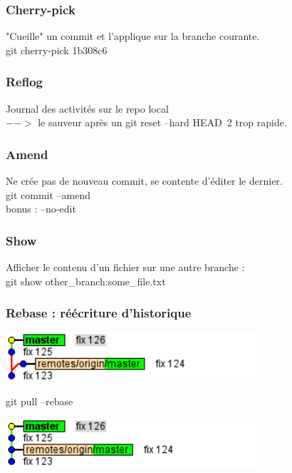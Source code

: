 
\begin{frame}\frametitle{Cherry-pick}
  "Cueille" un commit et l'applique sur la branche courante.\\
  \alert{git cherry-pick 1b308c6}
\end{frame}
\begin{frame}\frametitle{Reflog}
  Journal des activités sur le repo local\\
  $-->$ le sauveur après un git reset --hard HEAD~2 trop rapide.

\end{frame}
\begin{frame}\frametitle{Amend}
Ne crée pas de nouveau commit, se contente d'éditer le dernier.\\
  \alert{git commit --amend}\\
  bonus : --no-edit

\end{frame}
\begin{frame}[fragile]\frametitle{Show}
  Afficher le contenu d'un fichier sur une autre branche :\\
  \alert{git show other\_branch:some\_file.txt}

\end{frame}
\begin{frame}\frametitle{Rebase : réécriture d'historique}
  \begin{center}
    \includegraphics[width=0.7\textwidth]{./images/rebase-0.png}
  \end{center}
  \alert{git pull --rebase}
  \begin{center}
    \includegraphics[width=0.7\textwidth]{./images/rebase-1.png}
  \end{center}

\end{frame}
